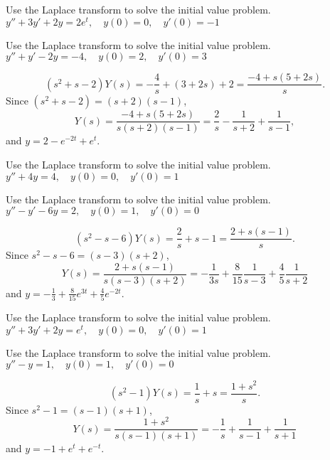 \documentclass{ximera}
\begin{document}
\begin{problem}\label{exer:8.3.11} Use the Laplace transform to solve the initial value problem. $y''+3y'+2y=2e^t, \quad  y(0)=0,\quad y'(0)=-1$
\end{problem}

\begin{problem}\label{exer:8.3.12} Use the Laplace transform to solve the initial value problem. $y''+y'-2y=-4, \quad  y(0)=2,\quad y'(0)=3$

\begin{solution}
$$
(s^2+s-2)Y(s)=-\frac{4}{s}+(3+2s)+2=\frac{-4+s(5+2s)}{s}.
$$
Since $(s^2+s-2)=(s+2)(s-1)$,
$$
Y(s)=\frac{-4+s(5+2s)}{s(s+2)(s-1)}
=\frac{2}{s}-\frac{1}{s+2}+\frac{1}{s-1},
$$
and  $y=2-e^{-2t}+e^t$.
\end{solution}
\end{problem}

\begin{problem}\label{exer:8.3.13} Use the Laplace transform to solve the initial value problem. $y''+4y=4, \quad  y(0)=0,\quad y'(0)=1$
\end{problem}

\begin{problem}\label{exer:8.3.14} Use the Laplace transform to solve the initial value problem. $y''-y'-6y=2, \quad  y(0)=1,\quad y'(0)=0$

\begin{solution}
$$
 (s^2-s-6)Y(s)=\frac{2}{s}+s-1=\frac{2+s(s-1)}{s}.
$$
Since $s^2-s-6=(s-3)(s+2)$,
$$
Y(s)=\frac{2+s(s-1)}{s(s-3)(s+2)}=
-\frac{1}{3s}+\frac{8}{15}\frac{1}{s-3}+\frac{4}{5}\frac{1}{s+2}
$$
and
 $y=-\frac{1}{3}+\frac{8}{15}e^{3t}
+\frac{4}{5}e^{-2t}$.
\end{solution}
\end{problem}

\begin{problem}\label{exer:8.3.15} Use the Laplace transform to solve the initial value problem. $y''+3y'+2y=e^t, \quad  y(0)=0,\quad y'(0)=1$
\end{problem}

\begin{problem}\label{exer:8.3.16} Use the Laplace transform to solve the initial value problem. $y''-y=1, \quad  y(0)=1,\quad y'(0)=0$

\begin{solution}
$$
(s^2-1)Y(s)=\frac{1}{s}+s=\frac{1+s^2}{s}.
$$
Since $s^2-1=(s-1)(s+1)$,
$$
Y(s)=\frac{1+s^2}{s(s-1)(s+1)}=
-\frac{1}{s}+\frac{1}{s-1}+\frac{1}{s+1}
$$
and
 $y=-1+e^t+e^{-t}$.
\end{solution}
\end{problem}
\end{document}
